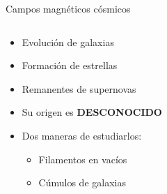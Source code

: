 \documentclass[xetex,aspectratio=169]{beamer}
\begin{document}
	\begin{frame}{Campos magnéticos cósmicos}
		\begin{columns}
			
			\begin{column}{0.48\textwidth}
				\begin{itemize}
					\item Evolución de galaxias
					\item Formación de estrellas
					\item Remanentes de supernovas
					\item Su origen es \alert{\textbf{DESCONOCIDO}}
				\end{itemize}
				\begin{itemize}
					\item Dos maneras de estudiarlos:
					\begin{itemize}
						\item Filamentos en vacíos
						\item Cúmulos de galaxias
					\end{itemize}
				\end{itemize}
			\end{column}
			
			\begin{column}{0.48\textwidth}
				
				
			\end{column}
		\end{columns}
	\end{frame}
	
\end{document}
